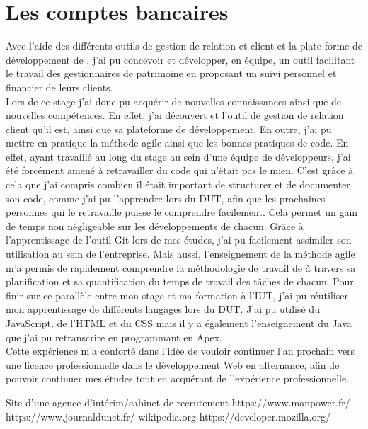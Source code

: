 \documentclass[12pt,oneside,noprintercorrection]{iut}
\begin{document}
\section{Les comptes bancaires}
 
Avec l'aide des différents outils de gestion de relation et client et la plate-forme de développement de \slf{}, j'ai pu concevoir et développer, en équipe, un outil facilitant le travail des gestionnaires de patrimoine en proposant un suivi personnel et financier de leurs clients.
~\\\indent Lors de ce stage j'ai donc pu acquérir de nouvelles connaissances ainsi que de nouvelles compétences. En effet, j'ai découvert \slf{} et l'outil de gestion de relation client qu'il est, ainsi que sa plateforme de développement. En outre, j'ai pu mettre en pratique la méthode agile ainsi que les bonnes pratiques de code. En effet, ayant travaillé au long du stage au sein d'une équipe de développeurs, j'ai été forcément amené à retravailler du code qui n'était pas le mien. C'est grâce à cela que j'ai compris combien il était important de structurer et de documenter son code, comme j'ai pu l'apprendre lors du DUT, afin que les prochaines personnes qui le retravaille puisse le comprendre facilement. Cela permet un gain de temps non négligeable sur les développements de chacun. Grâce à l'apprentissage de l'outil Git lors de mes études, j'ai pu facilement assimiler son utilisation au sein de l'entreprise. Mais aussi, l'enseignement de la méthode agile m'a permis de rapidement comprendre la méthodologie de travail de \gz{} à travers sa planification et sa quantification du temps de travail des tâches de chacun. Pour finir sur ce parallèle entre mon stage et ma formation à l'IUT, j'ai pu réutiliser mon apprentissage de différents langages lors du DUT. J'ai pu utilisé du JavaScript, de l'HTML et du CSS mais il y a également l'enseignement du Java que j'ai pu retranscrire en programmant en Apex.
~\\\indent Cette expérience m'a conforté dans l'idée de vouloir continuer l'an prochain vers une licence professionnelle dans le développement Web en alternance, afin de pouvoir continuer mes études tout en acquérant de l'expérience professionnelle. 


\small

Site d'une agence d'intérim/cabinet de recrutement https://www.manpower.fr/ \newline
https://www.journaldunet.fr/ \newline
wikipedia.org \newline
https://developer.mozilla.org/
\end{document}
